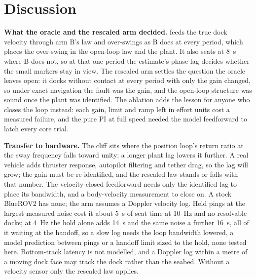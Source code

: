 \section{Discussion}
\label{sec:discussion}

\textbf{What the oracle and the rescaled arm decided.} \Bgt{} feeds the true dock velocity through arm B's law and over-swings as B does at every period, which places the over-swing in the open-loop law and the plant. It also seats at 8~s where B does not, so at that one period the estimate's phase lag decides whether the small markers stay in view. The rescaled arm settles the question the oracle leaves open: it docks without contact at every period with only the gain changed, so under exact navigation the fault was the gain, and the open-loop structure was sound once the plant was identified. The ablation adds the lesson for anyone who closes the loop instead: each gain, limit and ramp left in effort units cost a measured failure, and the pure PI at full speed needed the model feedforward to latch every core trial.

\textbf{Transfer to hardware.} The cliff sits where the position loop's return ratio at the sway frequency falls toward unity; a longer plant lag lowers it further. A real vehicle adds thruster response, autopilot filtering and tether drag, so the lag will grow; the gain must be re-identified, and the rescaled law stands or falls with that number. The velocity-closed feedforward needs only the identified lag to place its bandwidth, and a body-velocity measurement to close on. A stock BlueROV2 has none; the arm assumes a Doppler velocity log. Held pings at the largest measured noise cost it about 5~s of seat time at 10~Hz and no resolvable docks; at 4~Hz the hold alone adds 14~s and the same noise a further 16~s, all of it waiting at the handoff, so a slow log needs the loop bandwidth lowered, a model prediction between pings or a handoff limit sized to the hold, none tested here. Bottom-track latency is not modelled, and a Doppler log within a metre of a moving dock face may track the dock rather than the seabed. Without a velocity sensor only the rescaled law applies.

